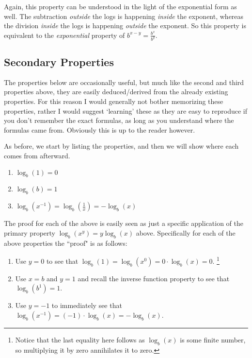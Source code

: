 \documentclass{ximera}
\begin{document}
        Again, this property can be understood in the light of the exponential form as well. The subtraction \textit{outside} the logs is happening \textit{inside} the exponent, whereas the division \textit{inside} the logs is happening \textit{outside} the exponent. So this property is equivalent to the \textit{exponential} property of $b^{x-y}=\frac{b^x}{b^y}$.

\subsection*{Secondary Properties}

    The properties below are occasionally useful, but much like the second and third properties above, they are easily deduced/derived from the already existing properties. For this reason I would generally not bother memorizing these properties, rather I would suggest `learning' these as they are easy to reproduce if you don't remember the exact formulas, as long as you understand where the formulas came from. Obviously this is up to the reader however.
    
    As before, we start by listing the properties, and then we will show where each comes from afterward.
    
    \begin{enumerate}
        \item $\log_b(1) = 0$
        \item $\log_b(b) = 1$
        \item $\log_b\left(x^{-1}\right) = \log_b\left(\frac{1}{x}\right) = -\log_b(x)$
    \end{enumerate}
    
    The proof for each of the above is easily seen as just a specific application of the primary property $\log_b\left(x^y\right) = y\log_b(x)$ above. Specifically for each of the above properties the ``proof" is as follows:
    
    \begin{enumerate}
        \item Use $y=0$ to see that $\log_b(1) = \log_b\left(x^0\right) = 0 \cdot \log_b(x) = 0$.%
        \footnote{Notice that the last equality here follows as $\log_b(x)$ is some finite number, so multiplying it by zero annihilates it to zero.}
        \item Use $x = b$ and $y = 1$ and recall the inverse function property to see that $\log_b\left(b^1\right) = 1$.
        \item Use $y = -1$ to immediately see that $\log_b\left(x^{-1}\right) = (-1)\cdot \log_b (x) = -\log_b(x)$.
    \end{enumerate}
    
\end{document}
